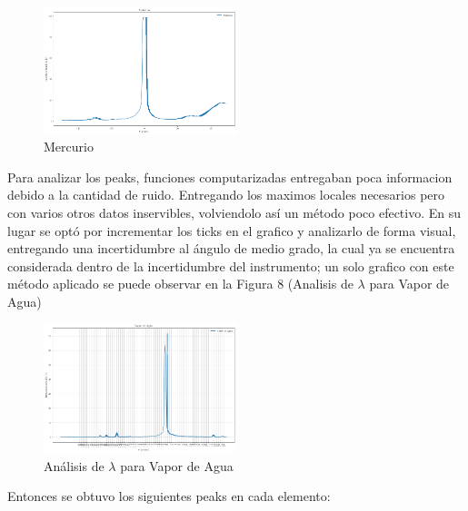 \documentclass[a4paper,twocolumn,10pt]{article}
\begin{document}
\begin{figure}[H]
    \centering
    \includegraphics[width=0.5\textwidth]{Plots/Mercurio.png}
    \caption{Mercurio}
    \label{fig:my_label}
\end{figure}
\bigskip
\bigskip
Para analizar los peaks, funciones computarizadas entregaban poca informacion debido a la cantidad de ruido. Entregando los maximos locales necesarios pero con varios otros datos inservibles, volviendolo así un método poco efectivo. 
En su lugar se optó por incrementar los ticks en el grafico y analizarlo de forma visual, entregando una incertidumbre al ángulo de medio grado, la cual ya se encuentra considerada dentro de la incertidumbre del instrumento; un solo grafico con este método aplicado se puede observar en la Figura 8 (Analisis de $\lambda$ para Vapor de Agua)

\begin{figure}[H]
    \centering
    \includegraphics[width=0.5\textwidth]{Plot Analisis/Vapor de Agua.png}
    \caption{Análisis de $\lambda$ para Vapor de Agua}
    \label{fig:my_label}
\end{figure}

Entonces se obtuvo los siguientes peaks en cada elemento:
\end{document}
